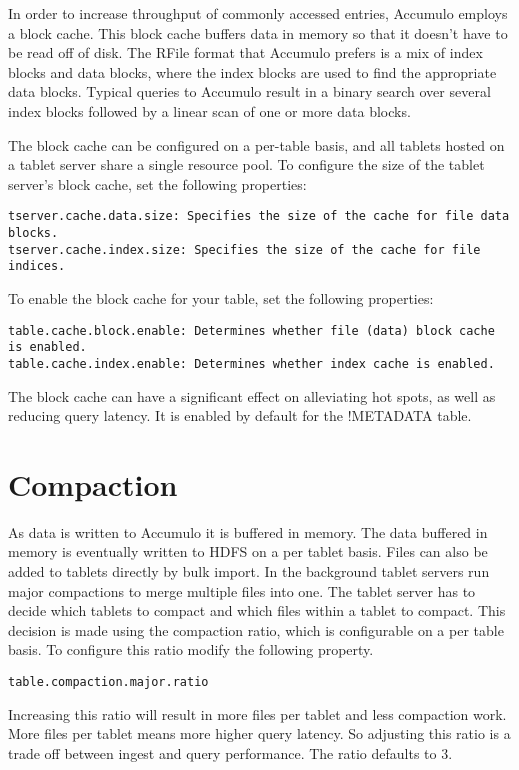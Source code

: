 In order to increase throughput of commonly accessed entries, Accumulo employs a block cache.
This block cache buffers data in memory so that it doesn't have to be read off of disk.
The RFile format that Accumulo prefers is a mix of index blocks and data blocks, where the index blocks are used to find the appropriate data blocks.
Typical queries to Accumulo result in a binary search over several index blocks followed by a linear scan of one or more data blocks.

The block cache can be configured on a per-table basis, and all tablets hosted on a tablet server share a single resource pool.
To configure the size of the tablet server's block cache, set the following properties:
\begin{verbatim}
tserver.cache.data.size: Specifies the size of the cache for file data blocks.
tserver.cache.index.size: Specifies the size of the cache for file indices.
\end{verbatim}
To enable the block cache for your table, set the following properties:
\begin{verbatim}
table.cache.block.enable: Determines whether file (data) block cache is enabled.
table.cache.index.enable: Determines whether index cache is enabled.
\end{verbatim}

The block cache can have a significant effect on alleviating hot spots, as well as reducing query latency.
It is enabled by default for the !METADATA table.

\section{Compaction}

As data is written to Accumulo it is buffered in memory.  The data buffered in
memory is eventually written to HDFS on a per tablet basis.  Files can also be
added to tablets directly by bulk import.  In the background tablet servers run
major compactions to merge multiple files into one.  The tablet server has to
decide which tablets to compact and which files within a tablet to compact.
This decision is made using the compaction ratio, which is configurable on a
per table basis.  To configure this ratio modify the following property.

\begin{verbatim}
table.compaction.major.ratio
\end{verbatim}  

Increasing this ratio will result in more files per tablet and less compaction
work.  More files per tablet means more higher query latency.  So adjusting
this ratio is a trade off between ingest and query performance.  The ratio
defaults to 3.  

